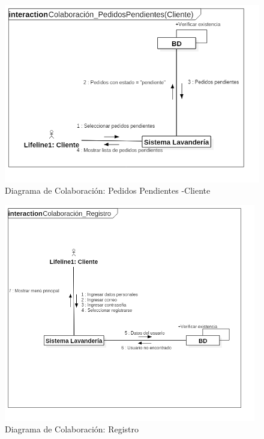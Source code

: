 \newpage
\begin{figure}[htb]
\begin{center}
\includegraphics[width=12cm]{./imagenes/diagramas/Colaboracion_PedidosPendientes(Cliente).png}
\end{center}
\caption{Diagrama de Colaboración: Pedidos Pendientes -Cliente}
\end{figure}

\newpage

\begin{figure}[htb]
\begin{center}
\includegraphics[width=11cm]{./imagenes/diagramas/Colaboracion_Registro.png}
\end{center}
\caption{Diagrama de Colaboración: Registro}
\end{figure}





